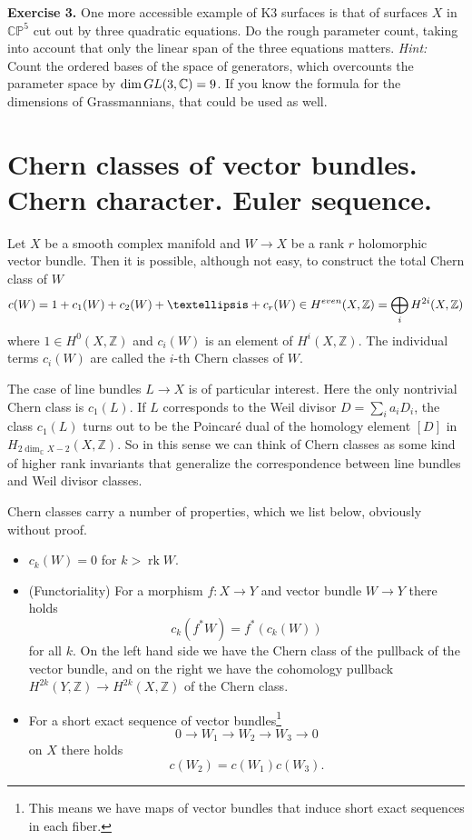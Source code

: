 \documentclass[11pt]{article}
\numberwithin{equation}{section}
\numberwithin{footnote}{section}
\newcommand{\blue}{\color{blue}}
\renewcommand{\P}{{\mathbb P}}
\newcommand{\Z}{{\mathbb Z}}
\newcommand{\C}{{\mathbb C}}
\DeclareMathOperator{\rk}{rk}
\begin{document}
{\bf Exercise 3.} One more accessible example of K3 surfaces is that of surfaces $X$ in $\C\P^5$ cut out by three quadratic equations. Do the rough parameter count, taking into account that only the linear span of the three equations matters. \emph{Hint:} Count the ordered bases of the space of generators, which overcounts the parameter space by
$\dim {\rm GL}(3,\C)=9$. If you know the formula for the dimensions of Grassmannians, that could be used as well.


\section{Chern classes of vector bundles. Chern character. Euler sequence.}
Let $X$ be a smooth complex manifold and $W\to X$ be a rank $r$ holomorphic vector bundle.
Then it is possible, although not easy, to construct the {\blue total Chern class} of $W$
$$
c(W) = 1 + c_1(W) + c_2(W) + \ldots + c_r(W) \in H^{\rm even}(X,\Z) = \bigoplus_{i}H^{2i}(X,\Z)
$$ 
where $1\in H^0(X,\Z)$ and $c_i(W)$ is an element of $H^i(X,\Z)$. The individual terms
$c_i(W)$ are called the $i$-th Chern classes of $W$.

\smallskip
The case of line bundles $L\to X$ is of particular interest. Here the only nontrivial Chern class is $c_1(L)$.
If $L$ corresponds to the Weil divisor $D=\sum_i a_iD_i$, the class
$c_1(L)$ turns out to be the Poincar\'e dual of the homology element $[D]$ in $H_{2\dim_\C X -2}(X,\Z)$.
So in this sense we can think of Chern classes as some kind of higher rank invariants that generalize the
correspondence between line bundles and Weil divisor classes.

\smallskip
Chern classes carry a number of properties, which we list below, obviously without proof.
\begin{itemize}
\item $c_k(W) = 0$ for $k>\rk W$.

\item (Functoriality) For a morphism $f:X\to Y$ and vector bundle $W\to Y$ there holds
$$
c_k (f^* W) = f^*(c_k(W))
$$
for all $k$. On the left hand side we have the Chern class of the pullback of the vector bundle, and on the right we have the cohomology pullback $H^{2k}(Y,\Z) \to H^{2k}(X,\Z)$ of the Chern class.

\item For a short exact sequence of vector bundles\footnote{ This means we have maps of vector bundles that induce short exact sequences in each fiber.}
$$
0\to W_1 \to W_2 \to W_3\to 0
$$
on $X$ there holds
$$
c(W_2) = c(W_1)c(W_3).
$$
\end{itemize}
\end{document}
